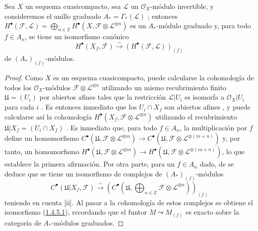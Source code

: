 \begin{proposition}[1.4.5]
\label{III.1.4.5}
\label{III.1.4.5-fr}
Sea $X$ un esquema cuasicompacto, sea $\mathcal L$ un $\mathcal O_X$-módulo invertible, y consideremos el anillo graduado $A_*=\Gamma_*(\mathcal L)$ ; entonces $H^\bullet(\mathcal F,\mathcal L)
=\bigoplus_{n\in\mathbb Z}H^\bullet(X,\mathcal F\otimes\mathcal L^{\otimes n})$ es un $A_*$-módulo graduado y, para todo $f\in A_n$, se tiene un isomorfismo canónico
\begin{equation}
\label{III.1.4.5.1-fr}
\tag{1.4.5.1}
H^\bullet(X_f,\mathcal F)
\xrightarrow{\sim}(H^\bullet(\mathcal F,\mathcal L))_{(f)}
\end{equation}
de $(A_*)_{(f)}$-módulos.
\end{proposition}

\begin{proof}
Como $X$ es un esquema cuasicompacto, puede calcularse la cohomología de todos los $\mathcal O_X$-módulos $\mathcal F\otimes\mathcal L^{\otimes n}$ utilizando un mismo recubrimiento finito $\mathfrak U=(U_i)$ por abiertos afines tales que la restricción
$\mathcal L\vert U_i$ es isomorfa a $\mathcal O_X\vert U_i$ para cada
$i$ .
Es entonces inmediato que los $U_i\cap X_f$ son abiertos afines , y puede calcularse así la cohomología $H^\bullet(X_f,\mathcal F\otimes\mathcal L^{\otimes n})$ utilizando el recubrimiento $\mathfrak U\vert X_f=(U_i\cap X_f)$ .
Es inmediato que, para todo $f\in A_n$, la multiplicación por $f$ define un homomorfismo $C^\bullet(\mathfrak U,\mathcal F\otimes\mathcal L^{\otimes m})
\longrightarrow
C^\bullet(\mathfrak U,\mathcal F\otimes\mathcal L^{\otimes(m+n)})$ y, por tanto, un homomorfismo $H^\bullet(\mathfrak U,\mathcal F\otimes\mathcal L^{\otimes m})
\longrightarrow
H^\bullet(\mathfrak U,\mathcal F\otimes\mathcal L^{\otimes(m+n)})$, lo que establece la primera afirmación.
Por otra parte, para un $f\in A_n$ dado, de  se deduce que se tiene un isomorfismo de complejos de $(A_*)_{(f)}$-módulos
\[
C^\bullet(\mathfrak U\vert X_f,\mathcal F)
\xrightarrow{\sim}
\left(C^\bullet\left(\mathfrak U,
\bigoplus_{n\in\mathbb Z}\mathcal F\otimes\mathcal L^{\otimes n}
\right)\right)_{(f)}
\]
teniendo en cuenta [ii].
Al pasar a la cohomología de estos complejos se obtiene el isomorfismo (\hyperref[III.1.4.5.1]{1.4.5.1}), recordando que el funtor $M\leadsto M_{(f)}$ es exacto sobre la categoría de $A_*$-módulos graduados.
\end{proof}

